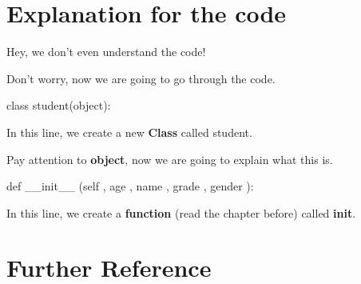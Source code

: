 \documentclass[12pt]{article}
\begin{document}
\section{Explanation for the code}
\begin{tcolorbox}[colback=blue!5!white,colframe=blue!50!white,title=Reader's Complain]
	Hey, we don't even understand the code!
\end{tcolorbox}
\par Don't worry, now we are going to go through the code.
\begin{python}
	class student(object):
\end{python}
\par In this line, we create a new \textbf{Class} called student.
\par Pay attention to \textbf{object}, now we are going to explain what this is.
\begin{python}
	def __init__ (self , age , name , grade , gender ):
\end{python}
\par In this line, we create a \textbf{function} (read the chapter before) called \textbf{init}.
\section{Further Reference}


\cite{Python}
\cite{wiki:xxx}
\end{document}
